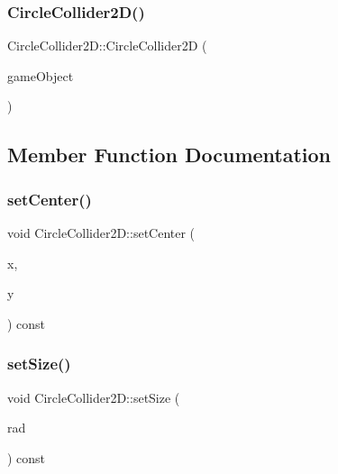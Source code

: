 \subsubsection{\texorpdfstring{Circle\+Collider2\+D()}{CircleCollider2D()}}
{\footnotesize\ttfamily Circle\+Collider2\+D\+::\+Circle\+Collider2D (\begin{DoxyParamCaption}\item[{std\+::shared\+\_\+ptr$<$ \hyperlink{class_mason_1_1_game_object}{Game\+Object} $>$}]{game\+Object }\end{DoxyParamCaption})\hspace{0.3cm}{\ttfamily [protected]}}



\subsection{Member Function Documentation}
\hypertarget{class_mason_1_1_circle_collider2_d_a2b0eb06e04c150ed9e7387e0d0bff461}{}\label{class_mason_1_1_circle_collider2_d_a2b0eb06e04c150ed9e7387e0d0bff461} 
\subsubsection{\texorpdfstring{set\+Center()}{setCenter()}}
{\footnotesize\ttfamily void Circle\+Collider2\+D\+::set\+Center (\begin{DoxyParamCaption}\item[{float}]{x,  }\item[{float}]{y }\end{DoxyParamCaption}) const}

\hypertarget{class_mason_1_1_circle_collider2_d_a309b612480b52a4ee538d70e79f447cb}{}\label{class_mason_1_1_circle_collider2_d_a309b612480b52a4ee538d70e79f447cb} 
\subsubsection{\texorpdfstring{set\+Size()}{setSize()}}
{\footnotesize\ttfamily void Circle\+Collider2\+D\+::set\+Size (\begin{DoxyParamCaption}\item[{float}]{rad }\end{DoxyParamCaption}) const}



